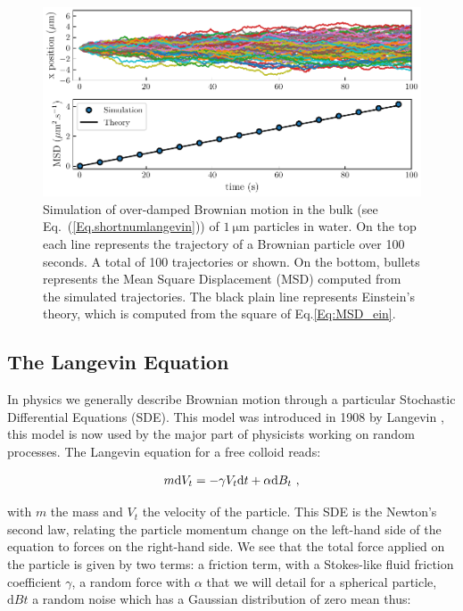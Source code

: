 \begin{figure}[!h]
	\centering
	\includegraphics{02_body/chapter1/image/brown_exemple.pdf}
	\caption{Simulation of over-damped Brownian motion in the bulk (see Eq.~(\ref{Eq.shortnumlangevin})) of $1 ~ \mathrm{\mu m}$ particles in water. On the top each line represents the trajectory of a Brownian particle over 100 seconds. A total of 100 trajectories or shown. On the bottom, bullets represents the Mean Square Displacement (\gls{MSD}) computed from the simulated trajectories. The black plain line represents Einstein's theory, which is computed from the square of Eq.\ref{Eq:MSD_ein}.\href{https://github.com/eXpensia/Ma-these/blob/main/02_body/chapter1/image/Simple_theory.ipynb}{\faGithub}}
	\label{fig:bulkbrown}
\end{figure}

\subsection{The Langevin Equation}

In physics we generally describe Brownian motion through a particular Stochastic Differential Equations (\gls{SDE}). This model was introduced in 1908 by Langevin \cite{langevin_sur_1908}, this model is now used by the major part of physicists working on random processes. The Langevin equation for a free colloid reads:

\begin{equation}
	m \textnormal{d}V_t  = - \gamma V_t \textnormal{d}t + \alpha \textnormal{d}B_t ~,
	\label{Eq.langevinEquation}
\end{equation}


with $m$ the mass and $V_t$ the velocity of the particle. This \gls{SDE} is the Newton's second law, relating the particle momentum change on the left-hand side of the equation to forces on the right-hand side. We see that the total force applied on the particle is given by two terms: a friction term, with a Stokes-like fluid friction coefficient $\gamma$, a random force with $\alpha$ that we will detail for a spherical particle, $\mathrm{d}Bt$ a random noise which has a Gaussian distribution of zero mean thus:


